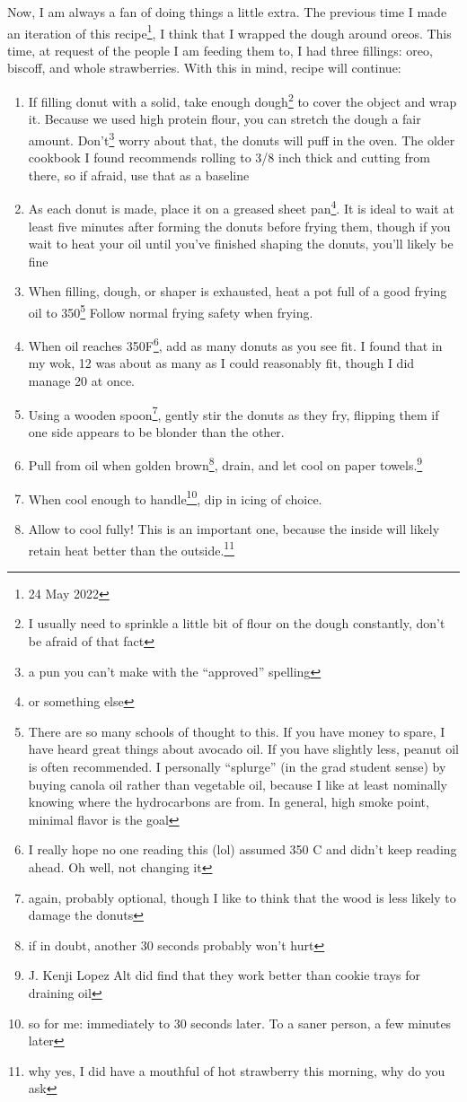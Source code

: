 \documentclass[12pt]{article}[titlepage]
\newcommand{\say}[1]{``#1''}
\renewcommand{\,}{\textsuperscript{,}}
\begin{document}
Now, I am always a fan of doing things a little extra.  
The previous time I made an iteration of this recipe\footnote{24 May 2022}, I think that I wrapped the dough around oreos.  
This time, at request of the people I am feeding them to, I had three fillings: oreo, biscoff, and whole strawberries.  
With this in mind, recipe will continue:

\begin{enumerate}  
\item If filling donut with a solid, take enough dough\footnote{I usually need to sprinkle a little bit of flour on the dough constantly, don't be afraid of that fact} to cover the object and wrap it. Because we used high protein flour, you can stretch the dough a fair amount. Don't\footnote{a pun you can't make with the \say{approved} spelling} worry about that, the donuts will puff in the oven. The older cookbook I found recommends rolling to 3/8 inch thick and cutting from there, so if afraid, use that as a baseline  
\item As each donut is made, place it on a greased sheet pan\footnote{or something else}. It is ideal to wait at least five minutes after forming the donuts before frying them, though if you wait to heat your oil until you've finished shaping the donuts, you'll likely be fine  
\item When filling, dough, or shaper is exhausted, heat a pot full of a good frying oil to 350\.\footnote{There are so many schools of thought to this. If you have money to spare, I have heard great things about avocado oil. If you have slightly less, peanut oil is often recommended. I personally \say{splurge} (in the grad student sense) by buying canola oil rather than vegetable oil, because I like at least nominally knowing where the hydrocarbons are from. In general, high smoke point, minimal flavor is the goal}  
Follow normal frying safety when frying.  
\item When oil reaches 350F\footnote{I really hope no one reading this (lol) assumed 350 C and didn't keep reading ahead. Oh well, not changing it}, add as many donuts as you see fit. I found that in my wok, 12 was about as many as I could reasonably fit, though I did manage 20 at once.  
\item Using a wooden spoon\footnote{again, probably optional, though I like to think that the wood is less likely to damage the donuts}, gently stir the donuts as they fry, flipping them if one side appears to be blonder than the other.  
\item Pull from oil when golden brown\footnote{if in doubt, another 30 seconds probably won't hurt}, drain, and let cool on paper towels.\footnote{J. Kenji Lopez Alt did find that they work better than cookie trays for draining oil}  
\item When cool enough to handle\footnote{so for me: immediately to 30 seconds later. To a saner person, a few minutes later}, dip in icing of choice.  
\item Allow to cool fully! This is an important one, because the inside will likely retain heat better than the outside.\footnote{why yes, I did have a mouthful of hot strawberry this morning, why do you ask}  
\end{enumerate}
\end{document}
